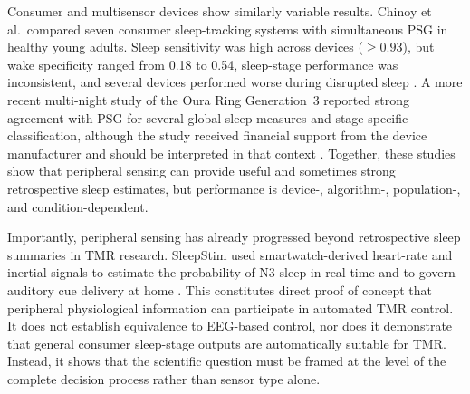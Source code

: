 Consumer and multisensor devices show similarly variable results. Chinoy
et al.\ compared seven consumer sleep-tracking systems with simultaneous PSG in
healthy young adults. Sleep sensitivity was high across devices
(\(\geq0.93\)), but wake specificity ranged from 0.18 to 0.54, sleep-stage
performance was inconsistent, and several devices performed worse during
disrupted sleep
\citep{chinoy2021consumer}. A more recent multi-night study of the Oura Ring
Generation~3 reported strong agreement with PSG for several global sleep
measures and stage-specific classification, although the study received
financial support from the device manufacturer and should be interpreted in
that context \citep{svensson2024oura}. Together, these studies show that
peripheral sensing can provide useful and sometimes strong retrospective sleep
estimates, but performance is device-, algorithm-, population-, and
condition-dependent.

Importantly, peripheral sensing has already progressed beyond retrospective
sleep summaries in TMR research. SleepStim used smartwatch-derived heart-rate
and inertial signals to estimate the probability of N3 sleep in real time and
to govern auditory cue delivery at home \citep{whitmore2022improving}. This
constitutes direct proof of concept that peripheral physiological information
can participate in automated TMR control. It does not establish equivalence to
EEG-based control, nor does it demonstrate that general consumer sleep-stage
outputs are automatically suitable for TMR. Instead, it shows that the
scientific question must be framed at the level of the complete decision
process rather than sensor type alone.


